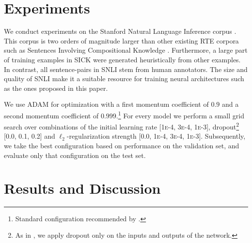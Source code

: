 \documentclass{article}
\begin{document}
\section{Experiments}
We conduct experiments on the Stanford Natural Language Inference corpus \cite[SNLI,][]{bowman2015large}.
This corpus is two orders of magnitude larger than other existing RTE corpora such as Sentences Involving Compositional Knowledge \citep[SICK,][]{marelli2014semeval}.
Furthermore, a large part of training examples in SICK were generated heuristically from other examples. In contrast, all sentence-pairs in SNLI stem from human annotators.
The size and quality of SNLI make it a suitable resource for training neural architectures such as the ones proposed in this paper.

We use ADAM \citep{kingma2015adam} for optimization with a first momentum coefficient of $0.9$ and a second momentum coefficient of $0.999$.\footnote{Standard configuration recommended by \citeauthor{kingma2015adam}.}
For every model we perform a small grid search over combinations of the initial learning rate [1\textsc{e}-4, 3\textsc{e}-4, 1\textsc{e}-3], dropout\footnote{As in \cite{zaremba2014recurrent}, we apply dropout only on the inputs and outputs of the network.} [0.0, 0.1, 0.2] and $\ell_2$-regularization strength [0.0, 1\textsc{e}-4, 3\textsc{e}-4, 1\textsc{e}-3].
Subsequently, we take the best configuration based on performance on the validation set, and evaluate only that configuration on the test set.

\section{Results and Discussion}
\end{document}
